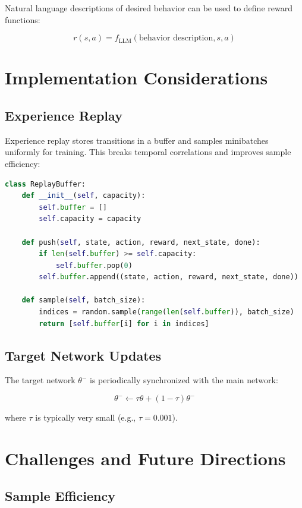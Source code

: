 \documentclass[10pt]{article}
\begin{document}
Natural language descriptions of desired behavior can be used to define reward functions:

\[
r(s,a) = f_{\text{LLM}}(\text{behavior description}, s, a)
\]

\section{Implementation Considerations}

\subsection{Experience Replay}

Experience replay stores transitions in a buffer and samples minibatches uniformly for training. This breaks temporal correlations and improves sample efficiency:

\begin{lstlisting}[language=Python]
class ReplayBuffer:
    def __init__(self, capacity):
        self.buffer = []
        self.capacity = capacity
    
    def push(self, state, action, reward, next_state, done):
        if len(self.buffer) >= self.capacity:
            self.buffer.pop(0)
        self.buffer.append((state, action, reward, next_state, done))
    
    def sample(self, batch_size):
        indices = random.sample(range(len(self.buffer)), batch_size)
        return [self.buffer[i] for i in indices]
\end{lstlisting}

\subsection{Target Network Updates}

The target network $\theta^-$ is periodically synchronized with the main network:

\[
\theta^- \leftarrow \tau \theta + (1 - \tau) \theta^-
\]

where $\tau$ is typically very small (e.g., $\tau = 0.001$).

\section{Challenges and Future Directions}

\subsection{Sample Efficiency}
\end{document}
